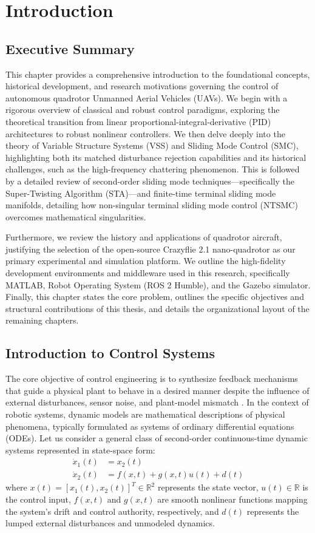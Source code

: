 \chapter{Introduction}
\label{ch:intro}

\section{Executive Summary}
This chapter provides a comprehensive introduction to the foundational concepts, historical development, and research motivations governing the control of autonomous quadrotor Unmanned Aerial Vehicles (UAVs). We begin with a rigorous overview of classical and robust control paradigms, exploring the theoretical transition from linear proportional-integral-derivative (PID) architectures to robust nonlinear controllers. We then delve deeply into the theory of Variable Structure Systems (VSS) and Sliding Mode Control (SMC), highlighting both its matched disturbance rejection capabilities and its historical challenges, such as the high-frequency chattering phenomenon. This is followed by a detailed review of second-order sliding mode techniques—specifically the Super-Twisting Algorithm (STA)—and finite-time terminal sliding mode manifolds, detailing how non-singular terminal sliding mode control (NTSMC) overcomes mathematical singularities. 

Furthermore, we review the history and applications of quadrotor aircraft, justifying the selection of the open-source Crazyflie 2.1 nano-quadrotor as our primary experimental and simulation platform. We outline the high-fidelity development environments and middleware used in this research, specifically MATLAB, Robot Operating System (ROS 2 Humble), and the Gazebo simulator. Finally, this chapter states the core problem, outlines the specific objectives and structural contributions of this thesis, and details the organizational layout of the remaining chapters.

\section{Introduction to Control Systems}
The core objective of control engineering is to synthesize feedback mechanisms that guide a physical plant to behave in a desired manner despite the influence of external disturbances, sensor noise, and plant-model mismatch \cite{ref_1}. In the context of robotic systems, dynamic models are mathematical descriptions of physical phenomena, typically formulated as systems of ordinary differential equations (ODEs). Let us consider a general class of second-order continuous-time dynamic systems represented in state-space form:
\begin{align}
\dot{x}_1(t) &= x_2(t) \\
\dot{x}_2(t) &= f(x,t) + g(x,t)u(t) + d(t)
\end{align}
where $x(t) = [x_1(t), x_2(t)]^T \in \mathbb{R}^2$ represents the state vector, $u(t) \in \mathbb{R}$ is the control input, $f(x,t)$ and $g(x,t)$ are smooth nonlinear functions mapping the system's drift and control authority, respectively, and $d(t)$ represents the lumped external disturbances and unmodeled dynamics.

